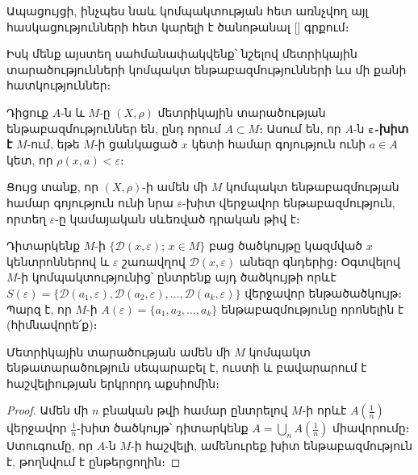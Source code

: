 \documentclass[./main.tex]{subfiles}
\begin{document}
\par Ապացույցի, ինչպես նաև կոմպակտության հետ առնչվող այլ հասկացություն\-նե\-րի հետ կարելի է ծանոթանալ [\qquad] գրքում։ 

\par Իսկ մենք այստեղ սահմանափակվենք՝ նշելով մետրիկային տարածությունների կոմպակտ ենթաբազմությունների ևս մի քանի հատկություններ։

\begin{definition}
Դիցուք $A$-ն և $M$-ը $(X, \rho)$ մետրիկային տարածության ենթաբազ\-մություններ են, ընդ որում $A \subset M$։ Ասում են, որ $A$-ն \textbf{$\boldsymbol{\varepsilon}$-խիտ է} $M$-ում, եթե $M$-ի ցանկացած $x$ կետի համար գոյություն ունի $a \in A$ կետ, որ $\rho(x, a) < \varepsilon$։
\end{definition}

\par Ցույց տանք, որ $(X, \rho)$-ի ամեն մի $M$ կոմպակտ ենթաբազմության համար գո\-յու\-թյուն ունի նրա $\varepsilon$-խիտ վերջավոր ենթաբազմություն, որտեղ $\varepsilon$-ը կամայական սևեռ\-ված դրական թիվ է։

\par Դիտարկենք $M$-ի $\{\mathcal{D}(x, \varepsilon);\, x \in M\}$ բաց ծածկույթը կազմված $x$ կենտրոններով և $\varepsilon$ շառավղով $\mathcal{D}(x, \varepsilon)$ անեզր գնդերից։ Օգտվելով $M$-ի կոմպակտությունից՝ ընտ\-րենք այդ ծածկույթի որևէ $S(\varepsilon) = \{\mathcal{D}(a_1, \varepsilon), \mathcal{D}(a_2, \varepsilon), \dots, \mathcal{D}(a_k, \varepsilon)\}$ վերջավոր ենթա\-ծածկույթ։ Պարզ է, որ $M$-ի $A(\varepsilon) = \{a_1, a_2, \dots, a_k\}$ ենթաբազմությունը որոնելին է (հիմ\-նա\-վո\-րե՛ք)։

\begin{theorem}\label{ch16thm13}
Մետրիկային տարածության ամեն մի $M$ կոմպակտ ենթա\-տա\-րա\-ծու\-թյուն սեպարաբել է, ուստի և բավարարում է հաշվելիության երկրորդ աքսիոմին։
\end{theorem}

\begin{proof}
Ամեն մի $n$ բնական թվի համար ընտրելով $M$-ի որևէ $A(\frac{1}{n})$ վեր\-ջա\-վոր $\frac{1}{n}$-խիտ ծածկույթ՝ դիտարկենք $A = \bigcup\limits_n A(\frac{1}{n})$ միավորումը։ Ստուգումը, որ $A$-ն $M$-ի հաշվելի, ամենուրեք խիտ ենթաբազմություն է, թողնվում է ընթերցողին։ 
\end{proof}
\end{document}

